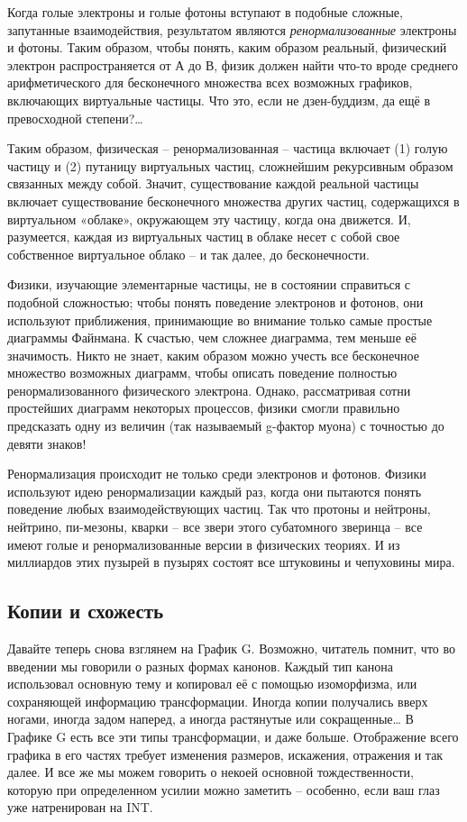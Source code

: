 \documentclass[../main.tex]{subfiles}
\begin{document}
Когда голые электроны и голые фотоны вступают в подобные сложные, запутанные взаимодействия, результатом являются \emph{ренормализованные} электроны и фотоны. Таким образом, чтобы понять, каким образом реальный, физический электрон распространяется от А до В, физик должен найти что-то вроде среднего арифметического для бесконечного множества всех возможных графиков, включающих виртуальные частицы. Что это, если не дзен-буддизм, да ещё в превосходной степени?\ldots{}

Таким образом, физическая \--- ренормализованная \--- частица включает (1) голую частицу и (2) путаницу виртуальных частиц, сложнейшим рекурсивным образом связанных между собой. Значит, существование каждой реальной частицы включает существование бесконечного множества других частиц, содержащихся в виртуальном «облаке», окружающем эту частицу, когда она движется. И, разумеется, каждая из виртуальных частиц в облаке несет с собой свое собственное виртуальное облако \--- и так далее, до бесконечности.

Физики, изучающие элементарные частицы, не в состоянии справиться с подобной сложностью; чтобы понять поведение электронов и фотонов, они используют приближения, принимающие во внимание только самые простые диаграммы Файнмана. К счастью, чем сложнее диаграмма, тем меньше её значимость. Никто не знает, каким образом можно учесть все бесконечное множество возможных диаграмм, чтобы описать поведение полностью ренормализованного физического электрона. Однако, рассматривая сотни простейших диаграмм некоторых процессов, физики смогли правильно предсказать одну из величин (так называемый g-фактор муона) с точностью до девяти знаков!

Ренормализация происходит не только среди электронов и фотонов. Физики используют идею ренормализации каждый раз, когда они пытаются понять поведение любых взаимодействующих частиц. Так что протоны и нейтроны, нейтрино, пи-мезоны, кварки \--- все звери этого субатомного зверинца \--- все имеют голые и ренормализованные версии в физических теориях. И из миллиардов этих пузырей в пузырях состоят все штуковины и чепуховины мира.


\subsection{Копии и схожесть}

Давайте теперь снова взглянем на График G. Возможно, читатель помнит, что во введении мы говорили о разных формах канонов. Каждый тип канона использовал основную тему и копировал её с помощью изоморфизма, или сохраняющей информацию трансформации. Иногда копии получались вверх ногами, иногда задом наперед, а иногда растянутые или сокращенные\ldots{} В Графике G есть все эти типы трансформации, и даже больше. Отображение всего графика в его частях требует изменения размеров, искажения, отражения и так далее. И все же мы можем говорить о некоей основной тождественности, которую при определенном усилии можно заметить \--- особенно, если ваш глаз уже натренирован на INT.
\end{document}

